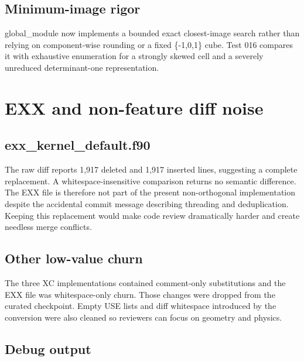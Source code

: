 \documentclass[10pt,a4paper]{report}
\begin{document}
\section{Minimum-image rigor}
global\_module now implements a bounded exact closest-image search rather than relying on component-wise rounding or a fixed \{-1,0,1\} cube. Test 016 compares it with exhaustive enumeration for a strongly skewed cell and a severely unreduced determinant-one representation.

\chapter{EXX and non-feature diff noise}
\section{exx\_kernel\_default.f90}
The raw diff reports 1,917 deleted and 1,917 inserted lines, suggesting a complete replacement. A whitespace-insensitive comparison returns no semantic difference. The EXX file is therefore not part of the present non-orthogonal implementation despite the accidental commit message describing threading and deduplication. Keeping this replacement would make code review dramatically harder and create needless merge conflicts.

\section{Other low-value churn}
The three XC implementations contained comment-only substitutions and the EXX file was whitespace-only churn. Those changes were dropped from the curated checkpoint. Empty USE lists and diff whitespace introduced by the conversion were also cleaned so reviewers can focus on geometry and physics.

\section{Debug output}
\begin{center}\end{center}
\end{document}
